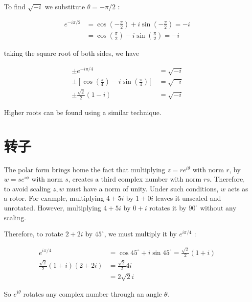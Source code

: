 To find $\sqrt{-i}$ we substitute $\theta=-\pi / 2$ :

$$
    \begin{aligned}
        e^{-i \pi / 2} & =\cos \left(-\frac{\pi}{2}\right)+i \sin \left(-\frac{\pi}{2}\right)=-i \\
                       & =\cos \left(\frac{\pi}{2}\right)-i \sin \left(\frac{\pi}{2}\right)=-i
    \end{aligned}
$$

taking the square root of both sides, we have

$$
    \begin{aligned}
        \pm e^{-i \pi / 4}                                                                & =\sqrt{-i} \\
        \pm\left[\cos \left(\frac{\pi}{4}\right)-i \sin \left(\frac{\pi}{4}\right)\right] & =\sqrt{-i} \\
        \pm \frac{\sqrt{2}}{2}(1-i)                                                       & =\sqrt{-i}
    \end{aligned}
$$

Higher roots can be found using a similar technique.

\section{转子}
The polar form brings home the fact that multiplying $z=r e^{i \theta}$ with norm $r$, by $w=s e^{i \phi}$ with norm $s$, creates a third complex number with norm $r s$. Therefore, to avoid scaling $z, w$ must have a norm of unity. Under such conditions, $w$ acts as a rotor. For example, multiplying $4+5 i$ by $1+0 i$ leaves it unscaled and unrotated. However, multiplying $4+5 i$ by $0+i$ rotates it by $90^{\circ}$ without any scaling.

Therefore, to rotate $2+2 i$ by $45^{\circ}$, we must multiply it by $e^{i \pi / 4}$ :

$$
    \begin{aligned}
        e^{i \pi / 4}                  & =\cos 45^{\circ}+i \sin 45^{\circ}=\frac{\sqrt{2}}{2}(1+i) \\
        \frac{\sqrt{2}}{2}(1+i)(2+2 i) & =\frac{\sqrt{2}}{2} 4 i                                    \\
                                       & =2 \sqrt{2} i
    \end{aligned}
$$

So $e^{i \theta}$ rotates any complex number through an angle $\theta$.

